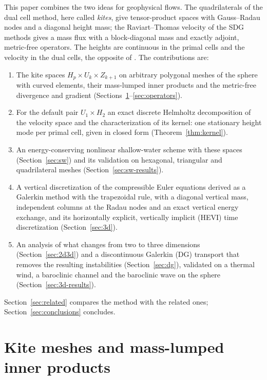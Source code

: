 \documentclass[preprint,12pt]{elsarticle}
\theoremstyle{definition}
\begin{document}
This paper combines the two ideas for geophysical flows. The quadrilaterals of the dual cell method,
here called \emph{kites}, give tensor-product spaces with Gauss--Radau nodes and a diagonal height mass;
the Raviart--Thomas velocity of the SDG methods gives a mass flux with a block-diagonal mass and
exactly adjoint, metric-free operators. The heights are continuous in the primal cells and the velocity
in the dual cells, the opposite of \cite{LengLanJu2026}. The contributions are:
\begin{enumerate}
\item The kite spaces $H_p\times U_k\times Z_{k+1}$ on arbitrary polygonal meshes of the sphere with curved
  elements, their mass-lumped inner products and the metric-free divergence and gradient
  (Sections~\ref{sec:mesh}--\ref{sec:operators}).
\item For the default pair $U_1\times H_2$ an exact discrete Helmholtz decomposition of the velocity space
  and the characterization of its kernel: one stationary height mode per primal cell, given in closed form
  (Theorem~\ref{thm:kernel}).
\item An energy-conserving nonlinear shallow-water scheme with these spaces (Section~\ref{sec:sw}) and its
  validation on hexagonal, triangular and quadrilateral meshes (Section~\ref{sec:sw-results}).
\item A vertical discretization of the compressible Euler equations derived as a Galerkin method with the
  trapezoidal rule, with a diagonal vertical mass, independent columns at the Radau nodes and an exact
  vertical energy exchange, and its horizontally explicit, vertically implicit (HEVI) time discretization
  (Section~\ref{sec:3d}).
\item An analysis of what changes from two to three dimensions (Section~\ref{sec:2d3d}) and a
  discontinuous Galerkin (DG) transport that removes the resulting instabilities (Section~\ref{sec:dg}),
  validated on a thermal wind, a baroclinic channel and the baroclinic wave on the sphere
  (Section~\ref{sec:3d-results}).
\end{enumerate}
Section~\ref{sec:related} compares the method with the related ones; Section~\ref{sec:conclusions}
concludes.

\section{Kite meshes and mass-lumped inner products}\label{sec:mesh}
\end{document}
